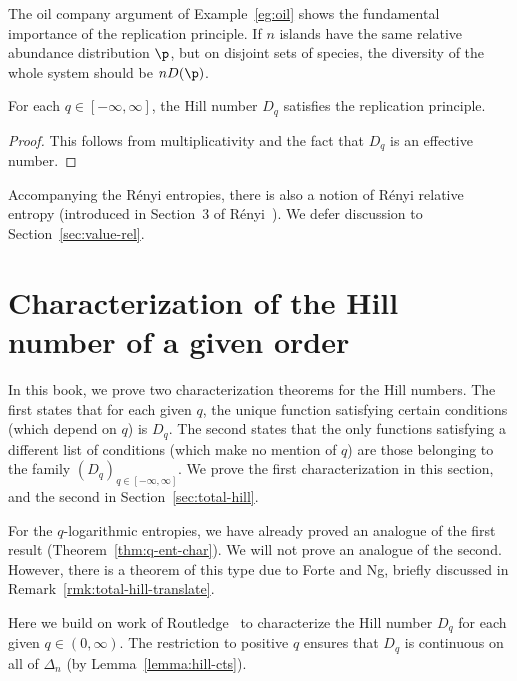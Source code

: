 The oil company argument of Example~\ref{eg:oil} shows the fundamental
importance of the replication principle.  If $n$ islands have the same
relative abundance distribution $\p$, but on disjoint sets of species, the
diversity of the whole system should be $nD(\p)$.

\begin{cor}[Replication]
% 
For each $q \in [-\infty, \infty]$, the Hill number $D_q$ satisfies the
replication principle.
\end{cor}

\begin{proof}
This follows from multiplicativity and the fact that $D_q$ is an effective
number. 
\end{proof}

Accompanying the R\'enyi entropies, there is also a notion of R\'enyi
relative entropy (introduced in Section~3 of R\'enyi~\cite{Reny}).  We
defer discussion to Section~\ref{sec:value-rel}.


\section{Characterization of the Hill number of a given order}


In this book, we prove two characterization theorems for the Hill numbers.
The first states that for each given $q$, the unique function satisfying
certain conditions (which depend on $q$) is $D_q$.  The second states that
the only functions satisfying a different list of conditions (which make no
mention of $q$) are those belonging to the family $(D_q)_{q \in [-\infty,
    \infty]}$.  We prove the first characterization in this section, and
the second in Section~\ref{sec:total-hill}.

For the $q$-logarithmic entropies, we have already proved an analogue of
the first result (Theorem~\ref{thm:q-ent-char}).  We will not prove an
analogue of the second.  However, there is a theorem of this type due to
Forte and Ng, briefly discussed in Remark~\ref{rmk:total-hill-translate}.

Here we build on work of Routledge~\cite{Rout} to characterize the Hill
number $D_q$ for each given $q \in (0, \infty)$.  The restriction to positive
$q$ ensures that $D_q$ is continuous on all of $\Delta_n$ (by
Lemma~\ref{lemma:hill-cts}).  

